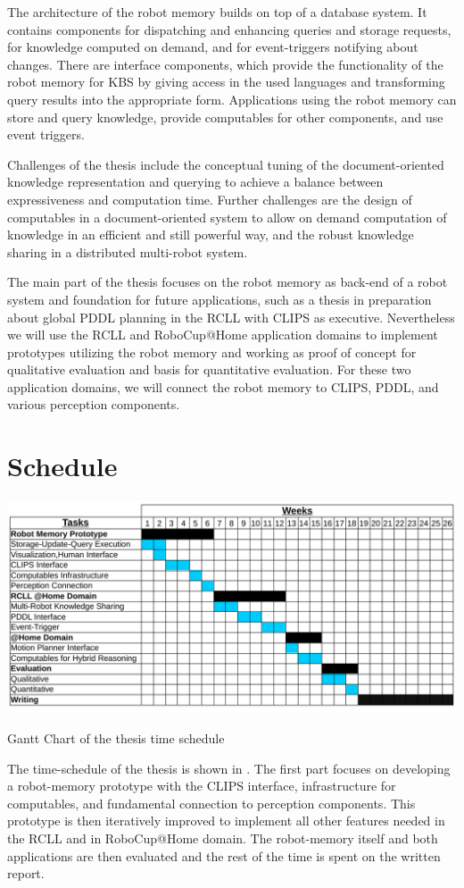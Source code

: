 The architecture of the robot memory builds on top of a database
system. It contains components for dispatching and enhancing queries
and storage requests, for knowledge computed on demand, and for
event-triggers notifying about changes. There are interface
components, which provide the functionality of the robot memory for
KBS by giving access in the used languages and transforming query
results into the appropriate form. Applications using the robot memory
can store and query knowledge, provide computables for other
components, and use event triggers.

Challenges of the thesis include the conceptual tuning of the
document-oriented knowledge representation and querying to achieve a
balance between expressiveness and computation time. Further
challenges are the design of computables in a document-oriented system
to allow on demand computation of knowledge in an efficient and still
powerful way, and the robust knowledge sharing in a distributed
multi-robot system.

The main part of the thesis focuses on the robot memory as back-end of
a robot system and foundation for future applications, such as a
thesis in preparation about global PDDL planning in the RCLL with
CLIPS as executive. Nevertheless we will use the RCLL and RoboCup@Home
application domains to implement prototypes utilizing the robot memory
and working as proof of concept for qualitative evaluation and basis
for quantitative evaluation. For these two application domains, we
will connect the robot memory to CLIPS, PDDL, and various perception
components.

\section{Schedule}
\begin{table}
  \centering
  \includegraphics[width=\textwidth]{gantt-chart}%
  \vspace{-5mm}
  \caption{Gantt Chart of the thesis time schedule}
  \label{tab:gantt}
\end{table}
The time-schedule of the thesis is shown in . The
first part focuses on developing a robot-memory prototype with the
CLIPS interface, infrastructure for computables, and fundamental
connection to perception components. This prototype is then
iteratively improved to implement all other features needed in the
RCLL and in RoboCup@Home domain. The robot-memory itself and both
applications are then evaluated and the rest of the time is spent on
the written report.
